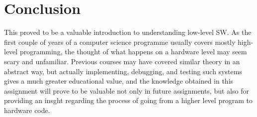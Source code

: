 \section{Conclusion}

This proved to be a valuable introduction to understanding low-level SW. As the first couple of years of a computer science programme usually covers mostly high-level programming, the thought of what happens on a hardware level may seem scary and unfamiliar. Previous courses may have covered similar theory in an abstract way, but actually implementing, debugging, and testing such systems gives a much greater educational value, and the knowledge obtained in this assignment will prove to be valuable not only in future assignments, but also for providing an insght regarding the process of going from a higher level program to hardware code.